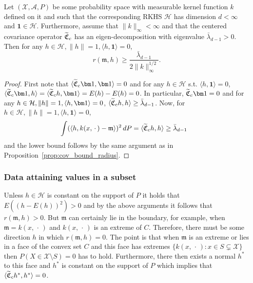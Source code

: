 \documentclass[10pt]{amsart}
\theoremstyle{definition}\newtheorem{defi}[theo]{Definition}\newtheorem{rema}[theo]{Remark}\newtheorem{exam}[theo]{Example}\newtheorem{exem}[theo]{Example}\newtheorem{nota}[theo]{Notation}
\theoremstyle{remark}
\newcommand{\X}{\mathcal{X}}
\newcommand{\clA}{\mathcal{A}}
\newcommand{\cH}{\mathcal{H}}
\newcommand{\fkC}{\mathfrak{C}}
\newcommand{\mean}{\mathfrak{m}}
\let\oldtilde\tilde
\renewcommand*{\tilde}[1]{\mathchoice{\widetilde{#1}}{\widetilde{#1}}{\oldtilde{#1}}{\oldtilde{#1}}}
\begin{document}
\begin{coro}\label{cor:cov_constant_inH}
Let $(\X,\clA,P)$ be some probability space with measurable kernel function $k$ defined on it and such that the corresponding RKHS $\cH$ has dimension $d<\infty$ and $\bm 1 \in \cH$. Furthermore, assume that $\|k\|_\infty < \infty$ and that the centered covariance operator $\tilde{\fkC}_c$ has an eigen-decomposition with eigenvalue $\bar \lambda_{d-1} > 0$. Then for any $h\in \cH, \|h\| =1, \langle h, \bm 1 \rangle = 0$,
\[
r(\mean,h) \geq \frac{\bar \lambda_{d-1}}{2\|k\|_\infty^{1/2}}.
\]
\end{coro}
\goodbreak
\begin{proof}
First note that $\langle \tilde{\fkC}_c \bm 1, \bm 1 \rangle = 0$ and for any $h \in \cH$ s.t. $\langle h, \bm 1 \rangle =0 $, $\langle \tilde{\fkC}_c \bm 1, h \rangle =\langle \tilde{\fkC}_c h, \bm 1 \rangle = E(h) - E(h) = 0$. In particular, $\tilde{\fkC}_c \bm 1 = 0$ and for any $h \in \cH, \|h\| =1,\linebreak \langle h, \bm 1 \rangle = 0$, $\langle \tilde{\fkC}_c h, h \rangle \geq \bar \lambda_{d-1}$. Now, for $h\in \cH, \|h\|=1, \langle h, \bm 1\rangle =0 $,
\begin{align*}
&\int (\langle h, k(x,\,\cdot\,) - \mean \rangle)^2 \, dP = \langle \tilde{\fkC}_c h, h \rangle \geq \bar \lambda_{d-1}
\end{align*}
and the lower bound follows by the same argument as in Proposition~\ref{prop:cov_bound_radius}.
\end{proof}

\subsubsection{Data attaining values in a subset} \label{sec:data_subset_covariance_arg}
Unless $h \in \cH$ is constant on the support of $P$ it holds that $E((h - E(h))^2) > 0 $ and by the above arguments it follows that $r(\mean,h) > 0$. But $\mean$ can certainly lie in the boundary, for example, when $\mean = k(x,\,\cdot\,)$ and $k(x,\,\cdot\,)$ is an extreme of $C$. Therefore, there must be some direction $h$ in which $r(\mean,h) = 0$. The point is that when $\mean$ is an extreme or lies in a face of the convex set $C$ and this face has extremes $\{ k(x, \,\cdot\,) : x \in S \subsetneq \X \}$ then $P(X \in \X \setminus S)= 0$ has to hold. Furthermore, there then exists a normal $h^*$ to this face and $h^*$ is constant on the support of $P$ which implies that $\langle \tilde{\fkC}_c h^*, h^* \rangle = 0$.
\end{document}
